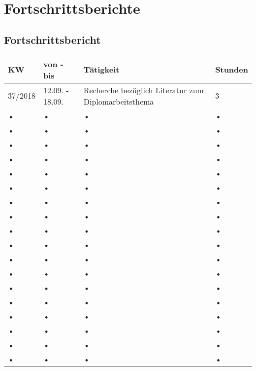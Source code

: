 \section{Fortschrittsberichte}
	
\SecAuth{\emplLastA} %
\subsection{Fortschrittsbericht \emplA}

\begin{longtable}{|p{}|p{}|p{}|p{}|}
\hline 
\rowcolor{lightgray}
\rule[-1ex]{0pt}{2.5ex} KW & von - bis & Tätigkeit & Stunden \\ 
\endhead %
\hline 
\rule[-1ex]{0pt}{2.5ex} 37/2018 & 12.09. - 18.09. & Recherche bezüglich Literatur zum Diplomarbeitsthema & \centerline{3} \\ 
\hline 
\rule[-1ex]{0pt}{2.5ex} • & • & • & • \\ 
\hline 
\rule[-1ex]{0pt}{2.5ex} • & • & • & • \\ 
\hline 
\rule[-1ex]{0pt}{2.5ex} • & • & • & • \\ 
\hline 
\rule[-1ex]{0pt}{2.5ex} • & • & • & • \\ 
\hline 
\rule[-1ex]{0pt}{2.5ex} • & • & • & • \\ 
\hline 
\rule[-1ex]{0pt}{2.5ex} • & • & • & • \\ 
\hline 
\rule[-1ex]{0pt}{2.5ex} • & • & • & • \\ 
\hline 
\rule[-1ex]{0pt}{2.5ex} • & • & • & • \\ 
\hline 
\rule[-1ex]{0pt}{2.5ex} • & • & • & • \\ 
\hline 
\rule[-1ex]{0pt}{2.5ex} • & • & • & • \\ 
\hline 
\rule[-1ex]{0pt}{2.5ex} • & • & • & • \\ 
\hline 
\rule[-1ex]{0pt}{2.5ex} • & • & • & • \\ 
\hline 
\rule[-1ex]{0pt}{2.5ex} • & • & • & • \\ 
\hline 
\rule[-1ex]{0pt}{2.5ex} • & • & • & • \\ 
\hline 
\rule[-1ex]{0pt}{2.5ex} • & • & • & • \\ 
\hline 
\rule[-1ex]{0pt}{2.5ex} • & • & • & • \\ 
\hline 
\rule[-1ex]{0pt}{2.5ex} • & • & • & • \\ 
\hline 
\rule[-1ex]{0pt}{2.5ex} • & • & • & • \\ 

\end{longtable}
